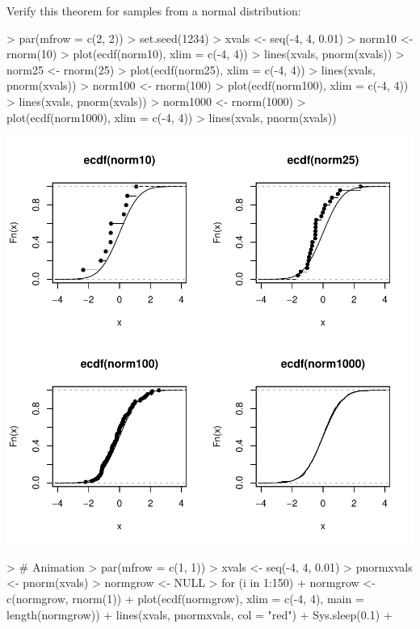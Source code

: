 Verify this theorem for samples from a normal distribution:

\begin{Schunk}
\begin{Sinput}
> par(mfrow = c(2, 2))
> set.seed(1234) 
> xvals <- seq(-4, 4, 0.01)
> norm10 <- rnorm(10)
> plot(ecdf(norm10), xlim = c(-4, 4))
> lines(xvals, pnorm(xvals))
> norm25 <- rnorm(25)
> plot(ecdf(norm25), xlim = c(-4, 4))
> lines(xvals, pnorm(xvals))
> norm100 <- rnorm(100)
> plot(ecdf(norm100), xlim = c(-4, 4))
> lines(xvals, pnorm(xvals))
> norm1000 <- rnorm(1000)
> plot(ecdf(norm1000), xlim = c(-4, 4))
> lines(xvals, pnorm(xvals))
\end{Sinput}
\end{Schunk}
\includegraphics{lect_chapter5_v2-035}


\begin{Schunk}
\begin{Sinput}
> # Animation
> par(mfrow = c(1, 1))
> xvals <- seq(-4, 4, 0.01)
> pnormxvals <- pnorm(xvals)
> normgrow <- NULL
> for (i in 1:150) {
+   normgrow <- c(normgrow, rnorm(1))
+   plot(ecdf(normgrow), xlim = c(-4, 4), main = length(normgrow))
+   lines(xvals, pnormxvals, col = "red")
+   Sys.sleep(0.1)
+ }
\end{Sinput}
\end{Schunk}


